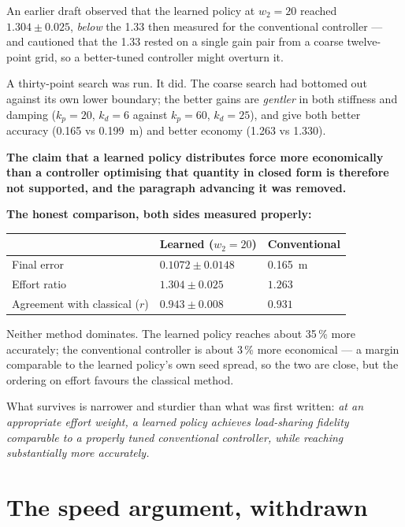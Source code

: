 \begin{trap}
An earlier draft observed that the learned policy at $w_2 = 20$ reached
$1.304 \pm 0.025$, \emph{below} the 1.33 then measured for the conventional
controller --- and cautioned that the 1.33 rested on a single gain pair from a
coarse twelve-point grid, so a better-tuned controller might overturn it.

A thirty-point search was run. It did. The coarse search had bottomed out against
its own lower boundary; the better gains are \emph{gentler} in both stiffness and
damping ($k_p = 20$, $k_d = 6$ against $k_p = 60$, $k_d = 25$), and give both
better accuracy (\SI{0.165}{} vs \SI{0.199}{\meter}) and better economy (1.263 vs
1.330).

\textbf{The claim that a learned policy distributes force more economically than
a controller optimising that quantity in closed form is therefore not supported,
and the paragraph advancing it was removed.}
\end{trap}

\textbf{The honest comparison, both sides measured properly:}

\begin{center}
\begin{tabular}{@{} L{5.6cm} C{3.4cm} C{3.4cm} @{}}
\toprule
& \textbf{Learned ($w_2 = 20$)} & \textbf{Conventional} \\
\midrule
Final error & $\mathbf{0.1072 \pm 0.0148}$ & \SI{0.165}{\meter} \\
Effort ratio & $1.304 \pm 0.025$ & $\mathbf{1.263}$ \\
Agreement with classical ($r$) & $\mathbf{0.943 \pm 0.008}$ & $0.931$ \\
\bottomrule
\end{tabular}
\end{center}

Neither method dominates. The learned policy reaches about 35\,\% more
accurately; the conventional controller is about 3\,\% more economical --- a
margin comparable to the learned policy's own seed spread, so the two are close,
but the ordering on effort favours the classical method.

What survives is narrower and sturdier than what was first written: \emph{at an
appropriate effort weight, a learned policy achieves load-sharing fidelity
comparable to a properly tuned conventional controller, while reaching
substantially more accurately.}

\section{The speed argument, withdrawn}

